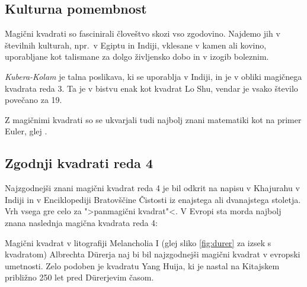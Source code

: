 \documentclass[a4paper,12pt]{article}
\newcommand{\pojem}[1]{\emph{\color{purple}#1}}
\begin{document}

\subsection{Kulturna pomembnost}

Magični kvadrati so fascinirali človeštvo skozi vso zgodovino. Najdemo jih
v številnih kulturah, npr.\ v Egiptu in Indiji, vklesane v kamen ali
kovino, uporabljane kot talismane za dolgo življensko dobo in v
izogib boleznim.

\pojem{Kubera-Kolam} je talna poslikava, ki se uporablja v Indiji, in je v
obliki magičnega kvadrata reda 3. Ta je v bistvu enak kot kvadrat
Lo Shu, vendar je vsako število povečano za 19.


Z magičnimi kvadrati so se ukvarjali tudi najbolj znani matematiki kot na
primer Euler, glej \cite{euler}. %


\subsection{Zgodnji kvadrati reda 4}

Najzgodnejši znani magični kvadrat reda 4 je bil odkrit na napisu
v Khajurahu v Indiji in v Enciklopediji Bratovščine Čistosti iz enajstega
ali dvanajstega stoletja. Vrh vsega gre celo za ">panmagični kvadrat"<.
V Evropi sta morda najbolj znana naslednja magična kvadrata reda 4:

Magični kvadrat v litografiji Melancholia I (glej sliko \ref{fig:durer}
za izsek s kvadratom) Albrechta Dürerja naj bi bil najzgodnejši magični kvadrat
v evropski umetnosti. Zelo podoben je kvadratu Yang Huija, ki je nastal na Kitajskem
približno 250 let pred Dürerjevim časom. %

\end{document}
